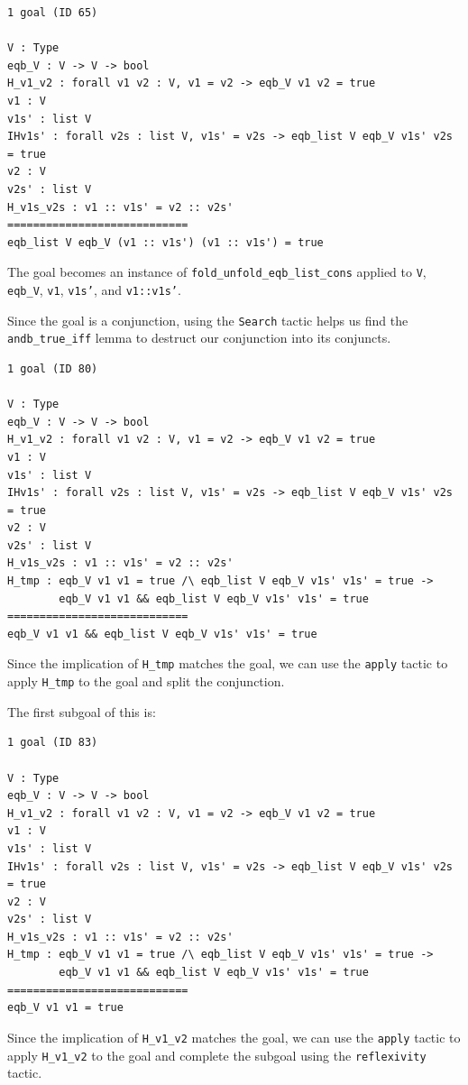 \documentclass{article}
\begin{document}
\begin{lstlisting}
1 goal (ID 65)

V : Type
eqb_V : V -> V -> bool
H_v1_v2 : forall v1 v2 : V, v1 = v2 -> eqb_V v1 v2 = true
v1 : V
v1s' : list V
IHv1s' : forall v2s : list V, v1s' = v2s -> eqb_list V eqb_V v1s' v2s = true
v2 : V
v2s' : list V
H_v1s_v2s : v1 :: v1s' = v2 :: v2s'
============================
eqb_list V eqb_V (v1 :: v1s') (v1 :: v1s') = true
\end{lstlisting}

The goal becomes an instance of \texttt{fold\_unfold\_eqb\_list\_cons} applied to \texttt{V}, \texttt{eqb\_V}, \texttt{v1}, \texttt{v1s'}, and \texttt{v1::v1s'}.

Since the goal is a conjunction, using the \texttt{Search} tactic helps us find the \texttt{andb\_true\_iff} lemma to destruct our conjunction into its conjuncts.

\begin{lstlisting}
1 goal (ID 80)

V : Type
eqb_V : V -> V -> bool
H_v1_v2 : forall v1 v2 : V, v1 = v2 -> eqb_V v1 v2 = true
v1 : V
v1s' : list V
IHv1s' : forall v2s : list V, v1s' = v2s -> eqb_list V eqb_V v1s' v2s = true
v2 : V
v2s' : list V
H_v1s_v2s : v1 :: v1s' = v2 :: v2s'
H_tmp : eqb_V v1 v1 = true /\ eqb_list V eqb_V v1s' v1s' = true ->
        eqb_V v1 v1 && eqb_list V eqb_V v1s' v1s' = true
============================
eqb_V v1 v1 && eqb_list V eqb_V v1s' v1s' = true
\end{lstlisting}

Since the implication of \texttt{H\_tmp} matches the goal, we can use the \texttt{apply} tactic to apply \texttt{H\_tmp} to the goal and split the conjunction.

The first subgoal of this is: 

\begin{lstlisting}
1 goal (ID 83)

V : Type
eqb_V : V -> V -> bool
H_v1_v2 : forall v1 v2 : V, v1 = v2 -> eqb_V v1 v2 = true
v1 : V
v1s' : list V
IHv1s' : forall v2s : list V, v1s' = v2s -> eqb_list V eqb_V v1s' v2s = true
v2 : V
v2s' : list V
H_v1s_v2s : v1 :: v1s' = v2 :: v2s'
H_tmp : eqb_V v1 v1 = true /\ eqb_list V eqb_V v1s' v1s' = true ->
        eqb_V v1 v1 && eqb_list V eqb_V v1s' v1s' = true
============================
eqb_V v1 v1 = true
\end{lstlisting}

Since the implication of \texttt{H\_v1\_v2} matches the goal, we can use the \texttt{apply} tactic to apply \texttt{H\_v1\_v2} to the goal and complete the subgoal using the \texttt{reflexivity} tactic.
\end{document}
